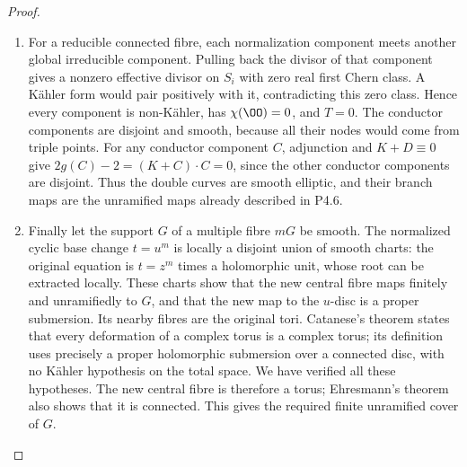 \begin{proof}
\begin{enumerate}[label={$\langle1\rangle$\arabic*.},leftmargin=*]
\item For a reducible connected fibre, each normalization component meets
another global irreducible component. Pulling back the divisor of
that component gives a nonzero effective divisor on $S_i$ with zero
real first Chern class. A Kähler form would pair positively with it,
contradicting this zero class. Hence every component is non-Kähler,
has $\chi(\OO)=0$, and $T=0$. The conductor components are disjoint
and smooth, because all their nodes would come from triple points.
For any conductor component $C$, adjunction and $K+D\equiv0$ give
$2g(C)-2=(K+C)\cdot C=0$, since the other conductor components
are disjoint. Thus the double curves are smooth elliptic, and their
branch maps are the unramified maps already described in P4.6.

\item Finally let the support $G$ of a multiple fibre $mG$ be smooth. The
normalized cyclic base change $t=u^m$ is locally a disjoint union of
smooth charts: the original equation is $t=z^m$ times a holomorphic
unit, whose root can be extracted locally. These charts show that
the new central fibre maps finitely and unramifiedly to $G$, and
that the new map to the $u$-disc is a proper submersion. Its nearby
fibres are the original tori. Catanese's theorem
\cite[Theorem~2.1]{Catanese2004} states that every
deformation of a complex torus is a complex torus; its definition
uses precisely a proper holomorphic submersion over a connected
disc, with no Kähler hypothesis on the total space. We have verified
all these hypotheses. The new central fibre is therefore a torus;
Ehresmann's theorem also shows that it is connected. This gives
the required finite unramified cover of $G$.

\end{enumerate}
\end{proof}